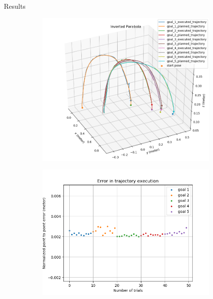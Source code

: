 \documentclass{beamer}
\begin{document}
		
	\begin{frame}{Results}
		\begin{figure}
			\begin{subfigure}[b]{0.49\linewidth}
				\includegraphics[scale=0.25]{images/2/inv_par.png}
			\end{subfigure}
			\begin{subfigure}[b]{0.49\linewidth}
				\includegraphics[scale=0.25]{images/2/inv_par_e.png}
			\end{subfigure}	
		\end{figure}
	\end{frame}
	
\end{document}
